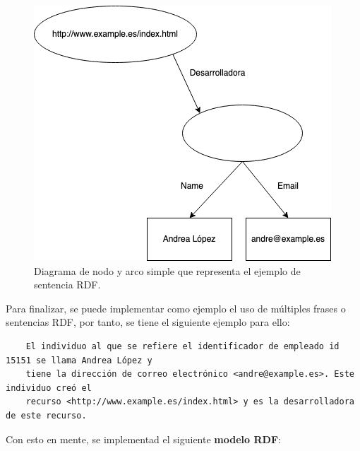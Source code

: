 \documentclass[11pt]{report}
\begin{document}
\begin{figure}[H]
	\centering
	\includegraphics[scale=0.7]{../img/Propiedad-Estructurada.png}
	\caption{Diagrama de nodo y arco simple que representa el ejemplo de sentencia RDF.}
	\label{fig:Diagrama-Nodo-Arco-2}
\end{figure}


Para finalizar, se puede implementar como ejemplo el uso de múltiples frases o sentencias RDF, por tanto, se tiene el siguiente ejemplo para ello:

\begin{verbatim}
	El individuo al que se refiere el identificador de empleado id 15151 se llama Andrea López y 
	tiene la dirección de correo electrónico <andre@example.es>. Este individuo creó el 
	recurso <http://www.example.es/index.html> y es la desarrolladora de este recurso.
\end{verbatim}

Con esto en mente, se implementad el siguiente \textbf{modelo RDF}:
\end{document}

